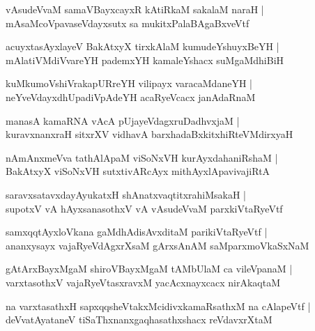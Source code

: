 \documentclass[twoside,12pt,openright]{book}
\newcounter{shloka}[chapter]
\begin{document}
\begin{shloka}%
vAsudeVvaM samaVBayxcayxR kAtiRkaM sakalaM naraH |\\
mAsaMcoVpavaseVdayxsutx sa mukitxPalaBAgaBxveVtf
\end{shloka}

\begin{shloka}%
acuyxtasAyxlayeV BakAtxyX tirxkAlaM kumudeYshuyxBeYH |\\
mAlatiVMdiVvareYH pademxYH kamaleYshacx suMgaMdhiBiH 
\end{shloka}

\begin{shloka}%
kuMkumoVshiVrakapURreYH vilipayx varacaMdaneYH |\\
neYveVdayxdhUpadiVpAdeYH acaRyeVcacx janAdaRnaM 
\end{shloka}

\begin{shloka}%
manasA kamaRNA vAcA pUjayeVdagxruDadhvxjaM |\\
kuravxnanxraH sitxrXV vidhavA barxhadaBxkitxhiRteVMdirxyaH
\end{shloka}

\begin{shloka}%
nAmAnxmeVva tathAlApaM viSoNxVH kurAyxdahaniRshaM |\\
BakAtxyX viSoNxVH sutxtivARcAyx mithAyxlApavivajiRtA 
\end{shloka}

\begin{shloka}%
saravxsatavxdayAyukatxH shAnatxvaqtitxrahiMsakaH |\\
supotxV vA hAyxsanasothxV vA vAsudeVvaM parxkiVtaRyeVtf 
\end{shloka}

\begin{shloka}%
samxqqtAyxloVkana gaMdhAdisAvxditaM parikiVtaRyeVtf |\\
ananxysayx vajaRyeVdAgxrXsaM gArxsAnAM saMparxmoVkaSxNaM 
\end{shloka}

\begin{shloka}%
gAtArxBayxMgaM shiroVBayxMgaM tAMbUlaM ca vileVpanaM |\\
varxtasothxV vajaRyeVtasxravxM yacAcxnayxcacx nirAkaqtaM 
\end{shloka}

\begin{shloka}%
na varxtasathxH sapxqqsheVtakxMcidivxkamaRsathxM na cAlapeVtf |\\
deVvatAyataneV tiSaThxnanxgaqhasathxshacx reVdavxrXtaM 
\end{shloka}
\end{document}
